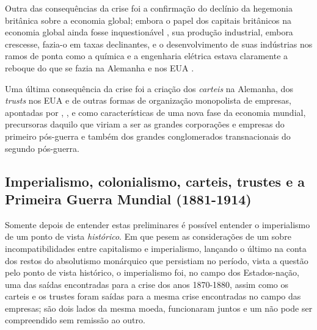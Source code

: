 Outra das consequências da crise foi a confirmação do declínio da hegemonia britânica sobre a economia global; embora o papel dos capitais britânicos na economia global ainda fosse inquestionável \cite{goetzmann_british_2006,rippy_britlat_1954,stone_british_1977}, sua produção industrial, embora crescesse, fazia-o em taxas declinantes, e o desenvolvimento de suas indústrias nos ramos de ponta como a química e a engenharia elétrica estava claramente a reboque do que se fazia na Alemanha e nos EUA \cite[p.~207]{Musson1959}. 

Uma última consequência da crise foi a criação dos \textit{carteis} na Alemanha, dos \textit{trusts} nos EUA e de outras formas de organização monopolista de empresas, apontadas por , , e  como características de uma nova fase da economia mundial, precursoras daquilo que viriam a ser as grandes corporações e empresas do primeiro pós-guerra e também dos grandes conglomerados transnacionais do segundo pós-guerra.

\subsection{Imperialismo, colonialismo, carteis, trustes e a Primeira Guerra Mundial (1881-1914)} \label{sec:impercol}

Somente depois de entender estas preliminares é possível entender o imperialismo de um ponto de vista \textit{histórico}. Em que pesem as considerações de um  sobre incompatibilidades entre capitalismo e imperialismo, lançando o último na conta dos restos do absolutismo monárquico que persistiam no período, vista a questão pelo ponto de vista histórico, o imperialismo foi, no campo dos Estados-nação, uma das saídas encontradas para a crise dos anos 1870-1880, assim como os carteis e os trustes foram saídas para a mesma crise encontradas no campo das empresas; são dois lados da mesma moeda, funcionaram juntos e um não pode ser compreendido sem remissão ao outro.

